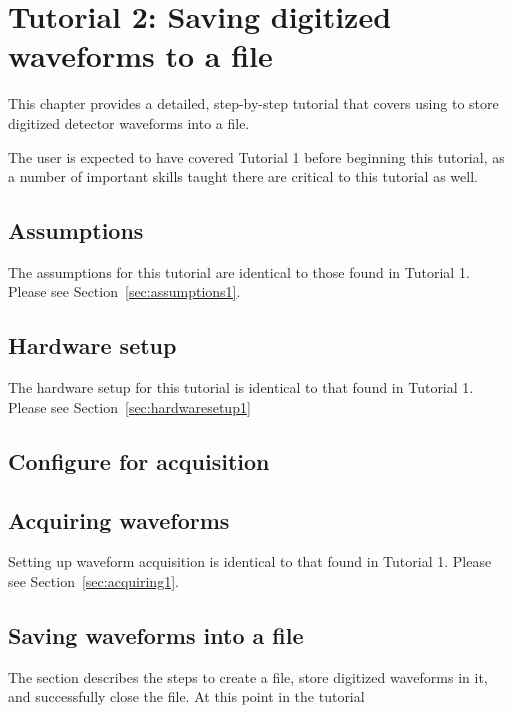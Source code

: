 \chapter{Tutorial 2: Saving digitized waveforms to a \ROOT file}
\label{chap:tutorial2}
This chapter provides a detailed, step-by-step tutorial that covers
using \ADAQ to store digitized detector waveforms into a \ROOT file.

The user is expected to have covered Tutorial 1 before beginning this
tutorial, as a number of important skills taught there are critical to
this tutorial as well.

\section{Assumptions}
\label{sec:assumptions2}
The assumptions for this tutorial are identical to those found in
Tutorial 1. Please see Section~\ref{sec:assumptions1}.

\section{Hardware setup}
\label{sec:hardwaresetup2}
The hardware setup for this tutorial is identical to that found in
Tutorial 1. Please see Section~\ref{sec:hardwaresetup1}

\section{Configure \ADAQ for acquisition}
\label{sec:configure2}

\section{Acquiring waveforms}
\label{sec:acquiring2}
Setting up waveform acquisition is identical to that found in Tutorial
1. Please see Section~\ref{sec:acquiring1}.

\section{Saving waveforms  into a \ROOT file}
The section describes the steps to create a \ROOT file, store
digitized waveforms in it, and successfully close the \ROOT file.
At this point in the tutorial

